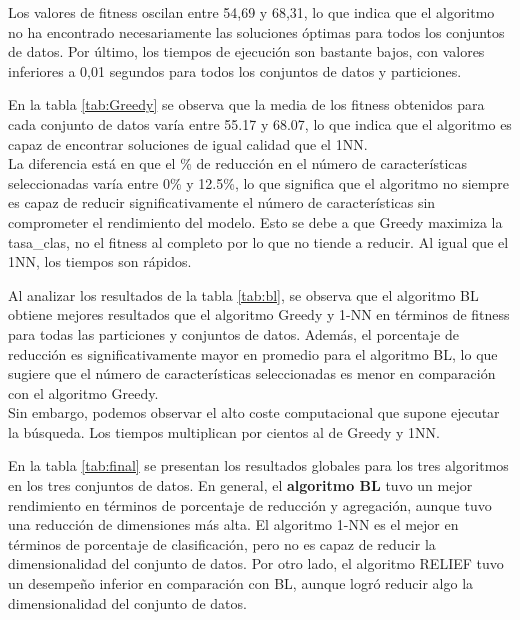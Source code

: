 Los valores de fitness oscilan entre 54,69 y 68,31, lo que indica que el algoritmo no ha encontrado necesariamente las soluciones óptimas para todos los conjuntos de datos. Por último, los tiempos de ejecución son bastante bajos, con valores inferiores a 0,01 segundos para todos los conjuntos de datos y particiones.



En la tabla \ref{tab:Greedy} se observa que la media de los fitness obtenidos para cada conjunto de datos varía entre 55.17 y 68.07, lo que indica que el algoritmo es capaz de encontrar soluciones de igual calidad que el 1NN.\\

La diferencia está en que el \% de reducción en el número de características seleccionadas varía entre 0\% y 12.5\%, lo que significa que el algoritmo no siempre es capaz de reducir significativamente el número de características sin comprometer el rendimiento del modelo. Esto se debe a que Greedy maximiza la tasa\_clas, no el fitness al completo por lo que no tiende a reducir. Al igual que el 1NN, los tiempos son rápidos.


Al analizar los resultados de la tabla \ref{tab:bl}, se observa que el algoritmo BL obtiene mejores resultados que el algoritmo Greedy y 1-NN en términos de fitness para todas las particiones y conjuntos de datos. Además, el porcentaje de reducción es significativamente mayor en promedio para el algoritmo BL, lo que sugiere que el número de características seleccionadas es menor en comparación con el algoritmo Greedy.\\

Sin embargo, podemos observar el alto coste computacional que supone ejecutar la búsqueda. Los tiempos multiplican por cientos al de Greedy y 1NN.



En la tabla \ref{tab:final} se presentan los resultados globales para los tres algoritmos en los tres conjuntos de datos. En general, el \textbf{algoritmo BL} tuvo un mejor rendimiento en términos de porcentaje de reducción y agregación, aunque tuvo una reducción de dimensiones más alta. El algoritmo 1-NN es el mejor en términos de porcentaje de clasificación, pero no es capaz de reducir la dimensionalidad del conjunto de datos. Por otro lado, el algoritmo RELIEF tuvo un desempeño inferior en comparación con BL, aunque logró reducir algo la dimensionalidad del conjunto de datos.\\

